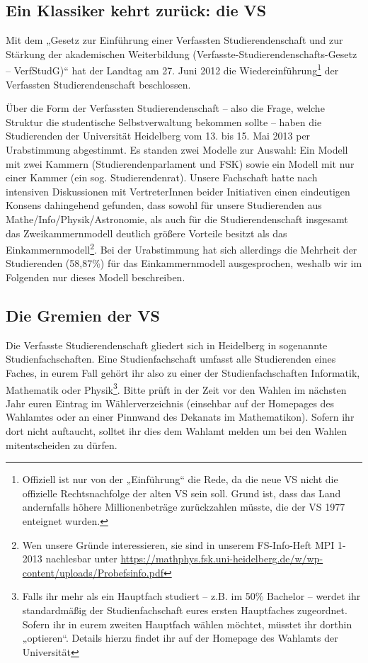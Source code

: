 \subsection{Ein Klassiker kehrt zurück: die VS}

Mit dem „Gesetz zur Einführung einer Verfassten Studierendenschaft und zur
Stärkung der akademischen Weiterbildung
(Ver\-fass\-te-Stu\-dier\-en\-den\-schafts-Ge\-setz -- VerfStudG)“ hat der
Landtag am 27. Juni 2012 die Wiedereinführung\footnote{Offiziell ist nur von
der „Einführung“ die Rede, da die neue VS nicht die offizielle Rechtsnachfolge
der alten VS sein soll. Grund ist, dass das Land andernfalls höhere
Millionenbeträge zurückzahlen müsste, die der VS 1977 enteignet wurden.} der
Verfassten Studierendenschaft beschlossen.

Über die Form der Verfassten Studierendenschaft -- also die Frage, welche
Struktur die studentische Selbstverwaltung bekommen sollte -- haben die
Studierenden der Universität Heidelberg vom 13. bis 15. Mai 2013 per
Urabstimmung abgestimmt. Es standen zwei Modelle zur Auswahl: Ein Modell mit
zwei Kammern (Studierendenparlament und FSK) sowie ein Modell mit nur einer
Kammer (ein sog. Studierendenrat). Unsere Fachschaft hatte nach intensiven
Diskussionen mit VertreterInnen beider Initiativen einen eindeutigen Konsens
dahingehend gefunden, dass sowohl für unsere Studierenden aus
Mathe/Info/Physik/Astronomie, als auch für die Studierendenschaft insgesamt das
Zweikammernmodell deutlich größere Vorteile besitzt als das
Einkammernmodell\footnote{Wen unsere Gründe interessieren, sie sind in unserem
FS-Info-Heft MPI 1-2013 nachlesbar unter
\url{https://mathphys.fsk.uni-heidelberg.de/w/wp-content/uploads/Probefsinfo.pdf}}.
Bei der Urabstimmung hat sich allerdings die Mehrheit der Studierenden
(58,87\%) für das Einkammernmodell ausgesprochen, weshalb wir im Folgenden nur
dieses Modell beschreiben.

\subsection{Die Gremien der VS}

Die Verfasste Studierendenschaft gliedert sich in Heidelberg in sogenannte
Studienfachschaften. Eine Studienfachschaft umfasst alle Studierenden eines
Faches, in eurem Fall gehört ihr also zu einer der Studienfachschaften
Informatik, Mathematik oder Physik\footnote{Falls ihr mehr als ein Hauptfach
studiert -- z.B. im 50\% Bachelor -- werdet ihr standardmäßig der
Studienfachschaft eures ersten Hauptfaches zugeordnet. Sofern ihr in eurem
zweiten Hauptfach wählen möchtet, müsstet ihr dorthin „optieren“. Details
hierzu findet ihr auf der Homepage des Wahlamts der Universität}. Bitte prüft
in der Zeit vor den Wahlen im nächsten Jahr euren Eintrag im Wählerverzeichnis
(einsehbar auf der Homepages des Wahlamtes oder an einer Pinnwand des Dekanats
im Mathematikon). Sofern ihr dort nicht auftaucht, solltet ihr dies dem Wahlamt
melden um bei den Wahlen mitentscheiden zu dürfen.


